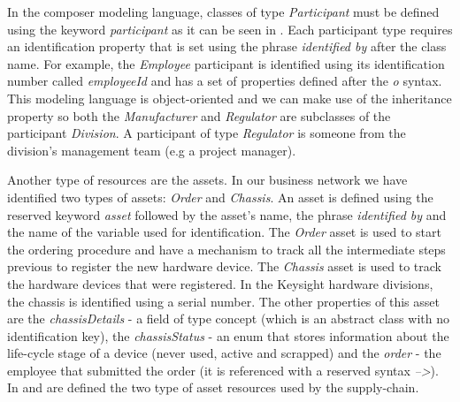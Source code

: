 In the composer modeling language, classes of type \emph{Participant} must be defined using the keyword \emph{participant} as it can be seen in . Each participant type requires an identification property that is set using the phrase \emph{identified by} after the class name. For example, the \emph{Employee} participant is identified using its identification number called \emph{employeeId} and has a set of properties defined after the \emph{o } syntax. This modeling language is object-oriented and we can make use of the inheritance property so both the \emph{Manufacturer} and \emph{Regulator} are subclasses of the participant \emph{Division}. A participant of type \emph{Regulator} is someone from the division's management team (e.g a project manager).


Another type of resources are the assets. In our business network we have identified two types of assets: \emph{Order} and \emph{Chassis}. 
An asset is defined using the reserved keyword \emph{asset} followed by the asset's name, the phrase \emph{identified by} and the name of the variable used for identification.
The \emph{Order} asset is used
to start the ordering procedure and have a mechanism to track all the intermediate steps previous to register the new hardware device. 
The \emph{Chassis} asset is used to track the hardware devices that were registered. In the Keysight hardware divisions, the chassis is identified using a serial number. The other properties of this asset are the \emph{chassisDetails} - a field of type concept (which is an abstract class with no identification key), the \emph{chassisStatus} - an enum that stores information about the life-cycle stage of a device (never used, active and scrapped) and the \emph{order} - the employee that submitted the order (it is referenced with a reserved syntax \emph{-->}).
In  and  are defined the two type of asset resources used by the supply-chain. 



